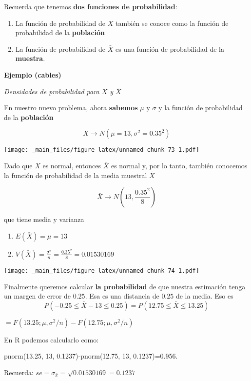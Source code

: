 \documentclass[
]{book}
\providecommand{\tightlist}{%
  \setlength{\itemsep}{0pt}\setlength{\parskip}{0pt}}
\begin{document}
Recuerda que tenemos \textbf{dos funciones de probabilidad}:

\begin{enumerate}
\def\labelenumi{\arabic{enumi}.}
\item
  La función de probabilidad de \(X\) también se conoce como la función de probabilidad de la \textbf{población}
\item
  La función de probabilidad de \(\bar{X}\) es una función de probabilidad de la \textbf{muestra}.
\end{enumerate}

\textbf{Ejemplo (cables)}

\emph{Densidades de probabilidad para \(X\) y \(\bar{X}\)}

En nuestro nuevo problema, ahora \textbf{sabemos} \(\mu\) y \(\sigma\) y la función de probabilidad de la \textbf{población}

\[X \rightarrow N(\mu=13, \sigma^2=0.35^2)\]

\texttt{[image: \_main\_files/figure-latex/unnamed-chunk-73-1.pdf]}

Dado que \(X\) es normal, entonces \(\bar{X}\) es normal y, por lo tanto, también conocemos la función de probabilidad de la media muestral \(\bar{X}\)

\[\bar{X} \rightarrow N(13, \frac{0.35^2}{8})\]

que tiene media y varianza

\begin{enumerate}
\def\labelenumi{\arabic{enumi})}
\tightlist
\item
  \(E(\bar{X})=\mu=13\)
\item
  \(V(\bar{X})=\frac{\sigma^2}{n}=\frac{0.35^2}{8}=0.01530169\)
\end{enumerate}

\texttt{[image: \_main\_files/figure-latex/unnamed-chunk-74-1.pdf]}

Finalmente queremos calcular \textbf{la probabilidad} de que nuestra estimación tenga un margen de error de \(0.25\). Esa es una distancia de \(0.25\) de la media. Eso es \[P(-0.25 \leq \bar{X} - 13\leq 0.25)=P(12.75 \leq \bar{X} \leq 13.25)\]

\(=F(13.25; \mu, \sigma^2/n)-F(12.75; \mu, \sigma^2/n)\)

En R podemos calcularlo como:

pnorm(13.25, 13, 0.1237)-pnorm(12.75, 13, 0.1237)=0.956.

Recuerda: \(se=\sigma_{\bar{x}}=\sqrt{0.01530169}=0.1237\)
\end{document}
